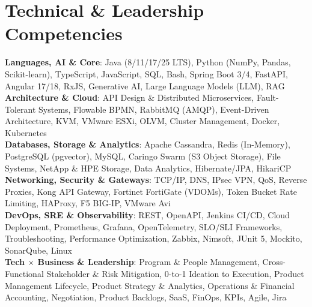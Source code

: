 \documentclass[letterpaper,9.5pt]{article}
\begin{document}
\section{Technical \& Leadership Competencies}
 \begin{itemize}[leftmargin=0.15in, label={}]
    \small{\item{
     \textbf{Languages, AI \& Core}{: Java (8/11/17/25 LTS), Python (NumPy, Pandas, Scikit-learn), TypeScript, JavaScript, SQL, Bash, Spring Boot 3/4, FastAPI, Angular 17/18, RxJS, Generative AI, Large Language Models (LLM), RAG} \\
     \textbf{Architecture \& Cloud}{: API Design \& Distributed Microservices, Fault-Tolerant Systems, Flowable BPMN, RabbitMQ (AMQP), Event-Driven Architecture, KVM, VMware ESXi, OLVM, Cluster Management, Docker, Kubernetes} \\
     \textbf{Databases, Storage \& Analytics}{: Apache Cassandra, Redis (In-Memory), PostgreSQL (pgvector), MySQL, Caringo Swarm (S3 Object Storage), File Systems, NetApp \& HPE Storage, Data Analytics, Hibernate/JPA, HikariCP} \\
     \textbf{Networking, Security \& Gateways}{: TCP/IP, DNS, IPsec VPN, QoS, Reverse Proxies, Kong API Gateway, Fortinet FortiGate (VDOMs), Token Bucket Rate Limiting, HAProxy, F5 BIG-IP, VMware Avi} \\
     \textbf{DevOps, SRE \& Observability}{: REST, OpenAPI, Jenkins CI/CD, Cloud Deployment, Prometheus, Grafana, OpenTelemetry, SLO/SLI Frameworks, Troubleshooting, Performance Optimization, Zabbix, Nimsoft, JUnit 5, Mockito, SonarQube, Linux} \\
     \textbf{Tech $\times$ Business \& Leadership}{: Program \& People Management, Cross-Functional Stakeholder \& Risk Mitigation, 0-to-1 Ideation to Execution, Product Management Lifecycle, Product Strategy \& Analytics, Operations \& Financial Accounting, Negotiation, Product Backlogs, SaaS, FinOps, KPIs, Agile, Jira}
    }}
 \end{itemize}
 \vspace{-4pt}

\end{document}
